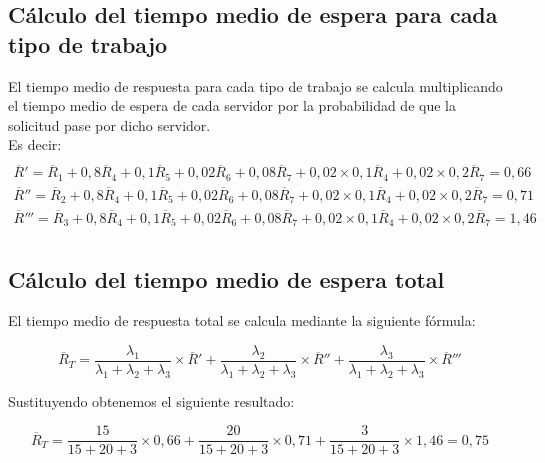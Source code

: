 \subsection{Cálculo del tiempo medio de espera para cada tipo de trabajo}
El tiempo medio de respuesta para cada tipo de trabajo se calcula multiplicando el tiempo medio de espera de cada servidor por la probabilidad de que la solicitud pase por dicho servidor.\\

Es decir:
\begin{multline}\\
\overline{R}' = \overline{R}_{1} + 0,8\overline{R}_{4} + 0,1\overline{R}_{5} + 0,02\overline{R}_{6} + 0,08\overline{R}_{7} + 0,02\times 0,1\overline{R}_{4} + 0,02\times 0,2\overline{R}_{7} = 0,66\\
\overline{R}'' = \overline{R}_{2} + 0,8\overline{R}_{4} + 0,1\overline{R}_{5} + 0,02\overline{R}_{6} + 0,08\overline{R}_{7} + 0,02\times 0,1\overline{R}_{4} + 0,02\times 0,2\overline{R}_{7} = 0,71\\
\overline{R}''' = \overline{R}_{3} + 0,8\overline{R}_{4} + 0,1\overline{R}_{5} + 0,02\overline{R}_{6} + 0,08\overline{R}_{7} + 0,02\times 0,1\overline{R}_{4} + 0,02\times 0,2\overline{R}_{7} = 1,46\\
\end{multline}

\subsection{Cálculo del tiempo medio de espera total}
El tiempo medio de respuesta total se calcula mediante la siguiente fórmula:

\begin{equation}
\overline{R}_{T} = \frac{\lambda_{1}}{\lambda_{1}+\lambda_{2}+\lambda_{3}}\times \overline{R}' + \frac{\lambda_{2}}{\lambda_{1}+\lambda_{2}+\lambda_{3}}\times \overline{R}'' + \frac{\lambda_{3}}{\lambda_{1}+\lambda_{2}+\lambda_{3}}\times \overline{R}'''
\end{equation}

Sustituyendo obtenemos el siguiente resultado:

\begin{equation}
\overline{R}_{T} = \frac{15}{15+20+3}\times 0,66 + \frac{20}{15+20+3}\times 0,71 + \frac{3}{15+20+3}\times 1,46 = 0,75
\end{equation}